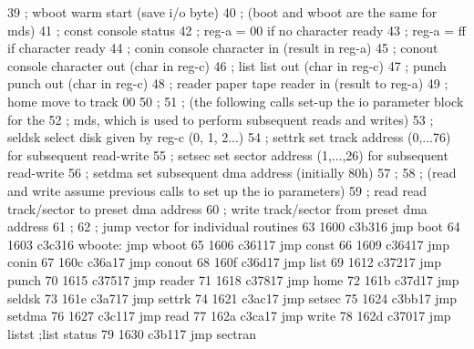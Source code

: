  39                       ;        wboot warm start (save i/o byte)
 40                       ;        (boot and wboot are the same for mds)
 41                       ;        const    console status
 42                       ;                 reg-a = 00 if no character ready
 43                       ;                 reg-a = ff if character ready
 44                       ;        conin    console character in (result in reg-a)
 45                       ;        conout   console character out (char in reg-c)
 46                       ;        list     list out (char in reg-c)
 47                       ;        punch    punch out (char in reg-c)
 48                       ;        reader   paper tape reader in (result to reg-a)
 49                       ;        home     move to track 00
 50                       ;
 51                       ;        (the following calls set-up the io parameter block for the
 52                       ;        mds, which is used to perform subsequent reads and writes)
 53                       ;        seldsk   select disk given by reg-c (0, 1, 2...)
 54                       ;        settrk   set track address (0,...76) for subsequent read-write
 55                       ;        setsec   set sector address (1,...,26) for subsequent read-write
 56                       ;        setdma   set subsequent dma address (initially 80h)
 57                       ;
 58                       ;        (read and write assume previous calls to set up the io parameters)
 59                       ;        read     read track/sector to preset dma address
 60                       ;        write    track/sector from preset dma address
 61                       ;
 62                       ;        jump vector for individual routines
 63      1600 c3b316               jmp      boot
 64      1603 c3c316      wboote:  jmp      wboot
 65      1606 c36117               jmp      const
 66      1609 c36417               jmp      conin
 67      160c c36a17               jmp      conout
 68      160f c36d17               jmp      list
 69      1612 c37217               jmp      punch
 70      1615 c37517               jmp      reader
 71      1618 c37817               jmp      home
 72      161b c37d17               jmp      seldsk
 73      161e c3a717               jmp      settrk
 74      1621 c3ac17               jmp      setsec
 75      1624 c3bb17               jmp      setdma
 76      1627 c3c117               jmp      read
 77      162a c3ca17               jmp      write
 78      162d c37017               jmp      listst     ;list status
 79      1630 c3b117               jmp      sectran
